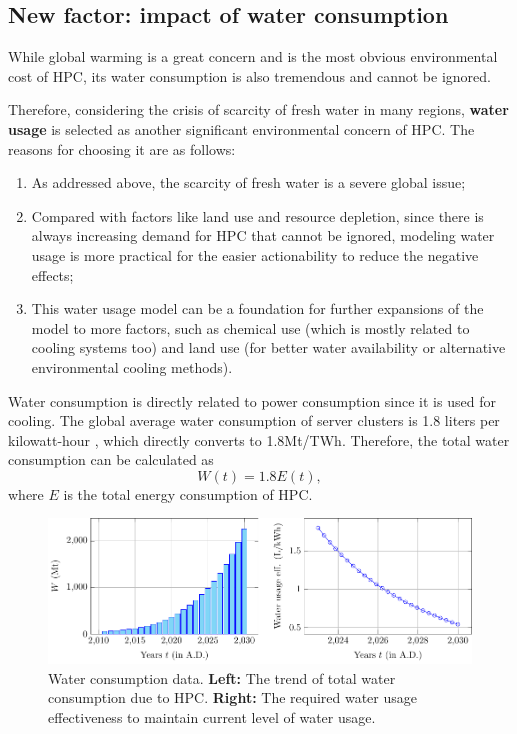 \documentclass[12pt]{article}
\begin{document}
\subsection{New factor: impact of water consumption}

While global warming is a great concern and is the most obvious environmental cost of HPC, its water consumption is also tremendous and cannot be ignored.

Therefore, considering the crisis of scarcity of fresh water in many regions, \textbf{water usage} is selected as another significant environmental concern of HPC. The reasons for choosing it are as follows:
\begin{enumerate}
	\item As addressed above, the scarcity of fresh water is a severe global issue;
	\item Compared with factors like land use and resource depletion, since there is always increasing demand for HPC that cannot be ignored, modeling water usage is more practical for the easier actionability to reduce the negative effects;
	\item This water usage model can be a foundation for further expansions of the model to more factors, such as chemical use (which is mostly related to cooling systems too) and land use (for better water availability or alternative environmental cooling methods).
\end{enumerate}

Water consumption is directly related to power consumption since it is used for cooling. The global average water consumption of server clusters is 1.8 liters per kilowatt-hour \citep{water_efficiency}, which directly converts to 1.8Mt/TWh. Therefore, the total water consumption can be calculated as
\begin{equation}
	W(t) = 1.8 E(t),
\end{equation}
where $E$ is the total energy consumption of HPC.

\begin{figure}[!t]
	\centering
	\includegraphics{figures/water/water.pdf}
	\caption{Water consumption data. \textbf{Left:} The trend of total water consumption due to HPC. \textbf{Right:} The required water usage effectiveness to maintain current level of water usage.}
	\label{fig_water}
\end{figure}
\end{document}
